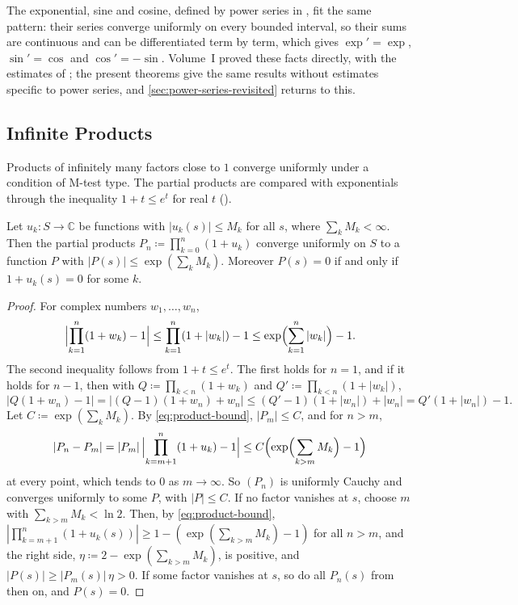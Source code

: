 The exponential, sine and cosine, defined by power series in , fit the same pattern: their series converge uniformly on every bounded interval, so their sums are continuous and can be differentiated term by term, which gives $\exp'=\exp$, $\sin'=\cos$ and $\cos'=-\sin$. Volume~I proved these facts directly, with the estimates of ; the present theorems give the same results without estimates specific to power series, and \cref{sec:power-series-revisited} returns to this.

\subsection{Infinite Products}

Products of infinitely many factors close to $1$ converge uniformly under a condition of M-test type. The partial products are compared with exponentials through the inequality $1+t\le e^t$ for real $t$ ().

\begin{proposition}
\label{prop:uniform-products}
Let $u_k\colon S\to\mathbb C$ be functions with $|u_k(s)|\le M_k$ for all $s$, where $\sum_kM_k<\infty$. Then the partial products $P_n\coloneqq\prod_{k=0}^n(1+u_k)$ converge uniformly on $S$ to a function $P$ with $|P(s)|\le\exp(\sum_kM_k)$. Moreover $P(s)=0$ if and only if $1+u_k(s)=0$ for some $k$.
\end{proposition}

\begin{proof}
For complex numbers $w_1,\ldots,w_n$,
\begin{equation}
\Bigl|\prod_{k=1}^n(1+w_k)-1\Bigr|\le\prod_{k=1}^n(1+|w_k|)-1\le\exp\Bigl(\sum_{k=1}^n|w_k|\Bigr)-1 .
\label{eq:product-bound}
\end{equation}
The second inequality follows from $1+t\le e^t$. The first holds for $n=1$, and if it holds for $n-1$, then with $Q\coloneqq\prod_{k<n}(1+w_k)$ and $Q'\coloneqq\prod_{k<n}(1+|w_k|)$,
\[
|Q(1+w_n)-1|=|(Q-1)(1+w_n)+w_n|\le(Q'-1)(1+|w_n|)+|w_n|=Q'(1+|w_n|)-1 .
\]
Let $C\coloneqq\exp(\sum_kM_k)$. By \eqref{eq:product-bound}, $|P_m|\le C$, and for $n>m$,
\[
|P_n-P_m|=|P_m|\,\Bigl|\prod_{k=m+1}^n(1+u_k)-1\Bigr|\le C\Bigl(\exp\Bigl(\sum_{k>m}M_k\Bigr)-1\Bigr)
\]
at every point, which tends to $0$ as $m\to\infty$. So $(P_n)$ is uniformly Cauchy and converges uniformly to some $P$, with $|P|\le C$. If no factor vanishes at $s$, choose $m$ with $\sum_{k>m}M_k<\ln2$. Then, by \eqref{eq:product-bound}, $|\prod_{k=m+1}^n(1+u_k(s))|\ge1-(\exp(\sum_{k>m}M_k)-1)$ for all $n>m$, and the right side, $\eta\coloneqq2-\exp(\sum_{k>m}M_k)$, is positive, and $|P(s)|\ge|P_m(s)|\,\eta>0$. If some factor vanishes at $s$, so do all $P_n(s)$ from then on, and $P(s)=0$.
\end{proof}

